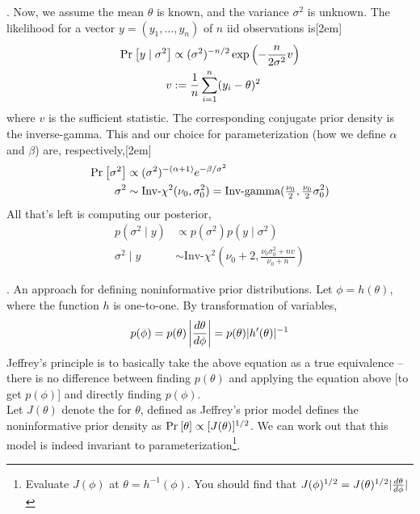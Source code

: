 \documentclass[11pt]{article}
\begin{document}
\myspace
\p {}. Now, we assume the mean $\theta$ is known, and the variance $\sigma^2$ is unknown. The likelihood for a vector $y = (y_1, \ldots, y_n)$ of $n$ iid observations is[2em]
\begin{align}
	\text{Pr}_{}\left[y \mid \sigma^2\right] &\propto (\sigma^2)^{-n/2} \exp\left(-\frac{n}{2\sigma^2} v\right) \\
	v &:= \frac{1}{n} \sum_{i=1}^{n} (y_i - \theta)^2
\end{align}
where $v$ is the sufficient statistic. The corresponding conjugate prior density is the inverse-gamma. This and our choice for parameterization (how we define $\alpha$ and $\beta$) are, respectively,[2em]
\begin{align}
	\text{Pr}_{}\left[\sigma^2\right] &\propto (\sigma^2)^{-(\alpha + 1)} e^{-\beta / \sigma^2} \\
	\sigma^2 &\sim \text{Inv-}\chi^2(\nu_0, \sigma_0^2) = \text{Inv-gamma}(\tfrac{\nu_0}{2}, \tfrac{\nu_0}{2}\sigma_0^2)
\end{align}
All that's left is computing our posterior,
\begin{align}
	p(\sigma^2 \mid y) &\propto p(\sigma^2) p(y \mid \sigma^2) \\
	\sigma^2 \mid y &\sim \text{Inv-}\chi^2\left(
		\nu_0 + 2,
		\frac{\nu_0 \sigma_0^2 + nv}{\nu_0 + n}
	\right)
\end{align}


\myspace
\p {}. An approach for defining noninformative prior distributions. Let $\phi = h(\theta)$, where the function $h$ is one-to-one. By transformation of variables,
\begin{align}
	p(\phi) = p(\theta) \left| \frac{d\theta}{d\phi} \right|  = p(\theta) |h'(\theta)|^{-1}
\end{align}
Jeffrey's principle is to basically take the above equation as a true equivalence -- there is no difference between finding $p(\theta)$ and applying the equation above [to get $p(\phi)$] and directly finding $p(\phi)$. \\

Let $J(\theta)$ denote the  for $\theta$, defined as
Jeffrey's prior model defines the noninformative prior density as $\text{Pr}_{}\left[\theta\right] \propto [J(\theta)]^{1/2}$. We can work out that this model is indeed invariant to parameterization\footnote{Evaluate $J(\phi)$ at $\theta = h^{-1}(\phi)$. You should find that $J(\phi)^{1/2} = J(\theta)^{1/2}|\frac{d\theta}{d\phi}|$}.
\end{document}
